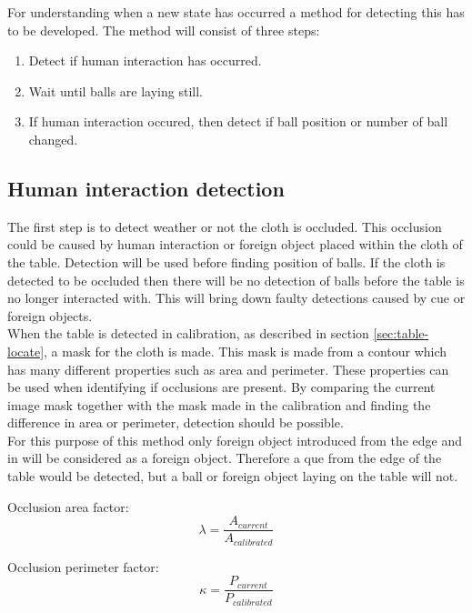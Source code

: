 For understanding when a new state has occurred a method for detecting this has to be developed. The method will consist of three steps:
\begin{enumerate}
	\item Detect if human interaction has occurred.
	\item Wait until balls are laying still.
	\item If human interaction occured, then detect if ball position or number of ball changed.
\end{enumerate}

\subsection{Human interaction detection}
The first step is to detect weather or not the cloth is occluded. This occlusion could be caused by human interaction or foreign object placed within the cloth of the table. Detection will be used before finding position of balls. If the cloth is detected to be occluded then there will be no detection of balls before the table is no longer interacted with. This will bring down faulty detections caused by cue or foreign objects.\\

When the table is detected in calibration, as described in section \ref{sec:table-locate}, a mask for the cloth is made. This mask is made from a contour which has many different properties such as area and perimeter. These properties can be used when identifying if occlusions are present. By comparing the current image mask together with the mask made in the calibration and finding the difference in area or perimeter, detection should be possible.\\

For this purpose of this method only foreign object introduced from the edge and in will be considered as a foreign object. Therefore a que from the edge of the table would be detected, but a ball or foreign object laying on the table will not.

Occlusion area factor:
\begin{equation}
\lambda = \frac{A_{current}}{A_{calibrated}}
\label{eq:area}
\end{equation}

Occlusion perimeter factor:
\begin{equation}
\kappa = \frac{P_{current}}{P_{calibrated}}
\label{eq:perimeter}
\end{equation}


